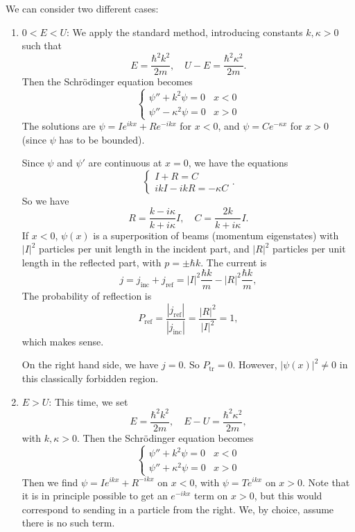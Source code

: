\documentclass[a4paper]{article}
\begin{document}
We can consider two different cases:
\begin{enumerate}
  \item $0 < E < U$: We apply the standard method, introducing constants $k, \kappa > 0$ such that
    \[
      E = \frac{\hbar^2 k^2}{2m},\quad U - E = \frac{\hbar^2 \kappa^2}{2m}.
    \]
    Then the Schr\"odinger equation becomes
    \[
      \begin{cases}
        \psi'' + k^2 \psi = 0 & x < 0\\
        \psi'' - \kappa^2 \psi = 0 & x > 0
      \end{cases}
    \]
    The solutions are $\psi = I e^{ikx} + Re^{-ikx}$ for $x < 0$, and $\psi = C e^{-\kappa x}$ for $x > 0$ (since $\psi$ has to be bounded).

    Since $\psi$ and $\psi'$ are continuous at $x = 0$, we have the equations
    \[
      \begin{cases}
        I + R = C\\
        ik I - ik R = - \kappa C
      \end{cases}.
    \]
    So we have
    \[
      R = \frac{k - i \kappa}{k + i \kappa} I,\quad C = \frac{2k}{k + i\kappa} I.
    \]
    If $x < 0$, $\psi(x)$ is a superposition of beams (momentum eigenstates) with $|I|^2$ particles per unit length in the incident part, and $|R|^2$ particles per unit length in the reflected part, with $p = \pm \hbar k$. The current is
    \[
      j = j_{\mathrm{inc}} + j_{\mathrm{ref}} = |I|^2 \frac{\hbar k}{m} - |R|^2 \frac{\hbar k}{m},
    \]
    The probability of reflection is
    \[
      P_{\mathrm{ref}} = \frac{|j_{\mathrm{ref}}|}{|j_{\mathrm{inc}}|} = \frac{|R|^2}{|I|^2} = 1,
    \]
    which makes sense.

    On the right hand side, we have $j = 0$. So $P_{\mathrm{tr}} = 0$. However, $|\psi(x)|^2 \not= 0$ in this classically forbidden region.

  \item $E > U$: This time, we set
    \[
      E = \frac{\hbar^2 k^2}{2m},\quad E - U = \frac{\hbar^2 \kappa^2}{2m},
    \]
    with $k, \kappa > 0$. Then the Schr\"odinger equation becomes
    \[
      \begin{cases}
        \psi'' + k^2 \psi = 0 & x < 0\\
        \psi'' + \kappa^2 \psi = 0 & x > 0
      \end{cases}
    \]
    Then we find $\psi = I e^{ikx} + R^{-ikx}$ on $x < 0$, with $\psi = T e^{ikx}$ on $x > 0$. Note that it is in principle possible to get an $e^{-ikx}$ term on $x > 0$, but this would correspond to sending in a particle from the right. We, by choice, assume there is no such term.


\end{enumerate}
\end{document}
